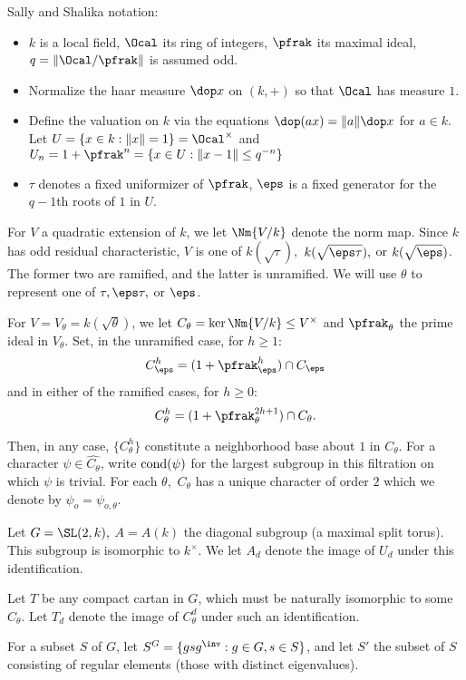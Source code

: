 Sally and Shalika notation:
\begin{itemize}
	\item $k$ is a local field, $\Ocal$ its ring of integers, $\pfrak$ its maximal ideal, $q= \|\Ocal /\pfrak \|$ is assumed odd. 
	\item Normalize the haar measure $\dop x$ on $(k,+)$ so that $ \Ocal$ has measure $1$. 
	\item Define the valuation on $k$ via the equations $\dop (ax)= \|a\| \dop x$ for $a\in k$. Let $U= \{x\in k : \|x\|=1\} = \Ocal^\times$ and $U_n = 1 + \pfrak^n = \{x \in U : \|x-1\| \leq q^{-n}\}$
	\item $\tau$ denotes a fixed uniformizer of $\pfrak$, $\eps$ is a fixed generator for the $q-1$th roots of $1$ in $U$. 
\end{itemize}

For $V$ a quadratic extension of $k$, we let $\Nm{V/k}$ denote the norm map. Since $k$ has odd residual characteristic, $V$ is one of $k(\sqrt{\tau}),$ $k(\sqrt{\eps \tau}),$ or $k(\sqrt{\eps})$. The former two are ramified, and the latter is unramified. We will use $\theta$ to represent one of $\tau, \eps \tau,$ or $\eps$.  

\def\cond#1{{\rm cond}(#1)}
For $V=V_\theta = k(\sqrt{\theta})$, we let $C_\theta = \ker \Nm{V/k} \leq V^\times$ and $\pfrak_\theta$ the prime ideal in $V_\theta$. Set, in the unramified case, for $h\geq 1$:
	\[ C_\eps ^{h} = (1 +\pfrak_\eps ^h) \cap C_\eps \] 
and in either of the ramified cases, for $h\geq 0$:
	\[ C_\theta^h  = (1+\pfrak_\theta^{2h+1})\cap C_\theta.\]

Then, in any case, $\{ C_\theta ^h \}$ constitute a neighborhood base about $1$ in $C_\theta$. For a character $\psi \in \hat{C_\theta}$, write $\cond{\psi}$ for the largest subgroup in this filtration on which $\psi$ is trivial. For each $\theta,$ $C_\theta$ has a unique character of order $2$ which we denote by $\psi_o=\psi_{o,\theta}$. 

Let $G = \SL(2,k),$ $A=A(k)$ the diagonal subgroup (a maximal split torus). This subgroup is isomorphic to $k^\times$. We let $A_d$ denote the image of $U_d$ under this identification. 

Let $T$ be any compact cartan in $G$, which must be naturally isomorphic to some $C_\theta$. Let $T_d$ denote the image of $C_\theta ^d$ under such an identification. 

For a subset $S$ of $G$, let $S^G = \{ g s g^\inv : g \in G, s \in S\}$, and let $S'$ the subset of $S$ consisting of regular elements (those with distinct eigenvalues). 
